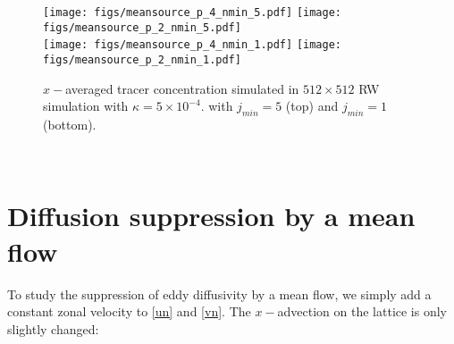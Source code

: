 \documentclass[11pt]{article}
\begin{document}
\begin{figure}[ht]
    \centering
    \texttt{[image: figs/meansource\_p\_4\_nmin\_5.pdf]}
     \texttt{[image: figs/meansource\_p\_2\_nmin\_5.pdf]}\\
    \texttt{[image: figs/meansource\_p\_4\_nmin\_1.pdf]}
     \texttt{[image: figs/meansource\_p\_2\_nmin\_1.pdf]}\\
    \caption{$x-$averaged tracer concentration simulated in $512\times 512$ RW simulation with $\kappa = 5 \times 10^{-4}$. 
        with $j_{min}=5$ (top) and $j_{min}=1$(bottom).}
            \label{p35}
\end{figure}

\
\section{Diffusion suppression by a mean flow}
To study the suppression of eddy diffusivity by a mean flow, we simply add a constant zonal velocity to 
\eqref{un} and \eqref{vn}. The $x-$advection on the lattice is only slightly changed:
\end{document}
